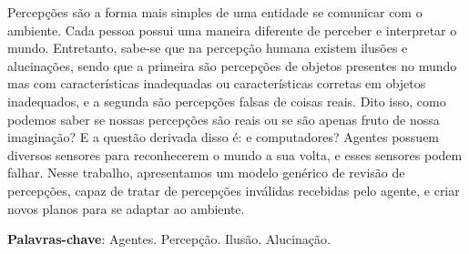 
\setlength{\absparsep}{18pt} %
\begin{resumo}
Percepções são a forma mais simples de uma entidade se comunicar com o ambiente. Cada pessoa possui uma maneira diferente de perceber e interpretar o mundo. Entretanto, sabe-se que na percepção humana existem ilusões e alucinações, sendo que a primeira são percepções de objetos presentes no mundo mas com características inadequadas ou características corretas em objetos inadequados, e a segunda são percepções falsas de coisas reais. Dito isso, como podemos saber se nossas percepções são reais ou se são apenas fruto de nossa imaginação? E a questão derivada disso é: e computadores? Agentes possuem diversos sensores para reconhecerem o mundo a sua volta, e esses sensores podem falhar. Nesse trabalho, apresentamos um modelo genérico de revisão de percepções, capaz de tratar de percepções inválidas recebidas pelo agente, e criar novos planos para se adaptar ao ambiente.

 \vspace{\onelineskip}
 \noindent
 \textbf{Palavras-chave}: Agentes. Percepção. Ilusão. Alucinação.

\end{resumo}

\iffalse
\begin{resumo}[Abstract]
 \begin{otherlanguage*}{english}
   This is the english abstract.


   \vspace{\onelineskip}
   \noindent 
   \textbf{Keywords}: Keywords1, Keywords2, Keywords3.
 \end{otherlanguage*}
\end{resumo}
\fi